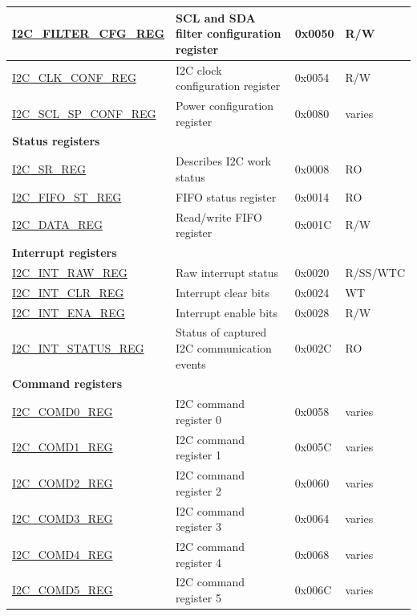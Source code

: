 \begin{longtable}{  | m{5.7cm} | m{7cm} | m{1.3cm} | m{1.5cm} | }
\hyperref[regdesc:I2CFILTERCFGREG]{I2C\_FILTER\_CFG\_REG} & SCL and SDA filter configuration register & 0x0050 & R/W \\ \hline
\hyperref[regdesc:I2CCLKCONFREG]{I2C\_CLK\_CONF\_REG} & I2C clock configuration register & 0x0054 & R/W \\ \hline
\hyperref[regdesc:I2CSCLSPCONFREG]{I2C\_SCL\_SP\_CONF\_REG} & Power configuration register & 0x0080 & varies \\ \hline
\multicolumn{4}{|l|}{\textbf{Status registers}} \\ \hline
\hyperref[regdesc:I2CSRREG]{I2C\_SR\_REG} & Describes I2C work status & 0x0008 & RO \\ \hline
\hyperref[regdesc:I2CFIFOSTREG]{I2C\_FIFO\_ST\_REG} & FIFO status register & 0x0014 & RO \\ \hline
\hyperref[regdesc:I2CDATAREG]{I2C\_DATA\_REG} & Read/write FIFO register & 0x001C & R/W \\ \hline
\multicolumn{4}{|l|}{\textbf{Interrupt registers}} \\ \hline
\hyperref[regdesc:I2CINTRAWREG]{I2C\_INT\_RAW\_REG} & Raw interrupt status & 0x0020 & R/SS/WTC \\ \hline
\hyperref[regdesc:I2CINTCLRREG]{I2C\_INT\_CLR\_REG} & Interrupt clear bits & 0x0024 & WT \\ \hline
\hyperref[regdesc:I2CINTENAREG]{I2C\_INT\_ENA\_REG} & Interrupt enable bits & 0x0028 & R/W \\ \hline
\hyperref[regdesc:I2CINTSTATUSREG]{I2C\_INT\_STATUS\_REG} & Status of captured I2C communication events & 0x002C & RO \\ \hline
\multicolumn{4}{|l|}{\textbf{Command registers}} \\ \hline
\hyperref[regdesc:I2CCOMD0REG]{I2C\_COMD0\_REG} & I2C command register 0 & 0x0058 & varies \\ \hline
\hyperref[regdesc:I2CCOMD1REG]{I2C\_COMD1\_REG} & I2C command register 1 & 0x005C & varies \\ \hline
\hyperref[regdesc:I2CCOMD2REG]{I2C\_COMD2\_REG} & I2C command register 2 & 0x0060 & varies \\ \hline
\hyperref[regdesc:I2CCOMD3REG]{I2C\_COMD3\_REG} & I2C command register 3 & 0x0064 & varies \\ \hline
\hyperref[regdesc:I2CCOMD4REG]{I2C\_COMD4\_REG} & I2C command register 4 & 0x0068 & varies \\ \hline
\hyperref[regdesc:I2CCOMD5REG]{I2C\_COMD5\_REG} & I2C command register 5 & 0x006C & varies \\ \hline

\end{longtable}
